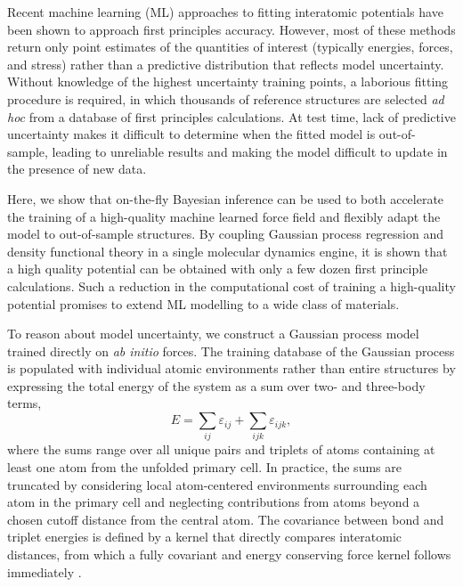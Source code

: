 \documentclass[%
reprint,
superscriptaddress,
amsmath,amssymb,
aps,
prl,
]{revtex4-1}
\begin{document}
Recent machine learning (ML) approaches to fitting interatomic potentials have been shown to approach first principles accuracy. However, most of these methods return only point estimates of the quantities of interest (typically energies, forces, and stress) rather than a predictive distribution that reflects model uncertainty. Without knowledge of the highest uncertainty training points, a laborious fitting procedure is required, in which thousands of reference structures are selected \textit{ad hoc} from a database of first principles calculations. At test time, lack of predictive uncertainty makes it difficult to determine when the fitted model is out-of-sample, leading to unreliable results and making the model difficult to update in the presence of new data.

Here, we show that on-the-fly Bayesian inference can be used to both accelerate the training of a high-quality machine learned force field and flexibly adapt the model to out-of-sample structures. By coupling Gaussian process regression and density functional theory in a single molecular dynamics engine, it is shown that a high quality potential can be obtained with only a few dozen first principle calculations. Such a reduction in the computational cost of training a high-quality potential promises to extend ML modelling to a wide class of materials.

To reason about model uncertainty, we construct a Gaussian process model trained directly on \textit{ab initio} forces. The training database of the Gaussian process is populated with individual atomic environments rather than entire structures by expressing the total energy of the system as a sum over two- and three-body terms,
\begin{equation}
E = \sum_{ij} \varepsilon_{ij} + \sum_{ijk} \varepsilon_{ijk},
\end{equation}
where the sums range over all unique pairs and triplets of atoms containing at least one atom from the unfolded primary cell. In practice, the sums are truncated by considering local atom-centered environments surrounding each atom in the primary cell and neglecting contributions from atoms beyond a chosen cutoff distance from the central atom. The covariance between bond and triplet energies is defined by a kernel that directly compares interatomic distances, from which a fully covariant and energy conserving force kernel follows immediately \cite{glielmo2017accurate, glielmo2018efficient}. 


\end{document}

